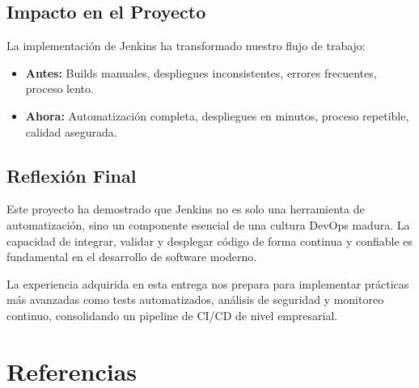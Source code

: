 \documentclass[12pt,a4paper]{article}
\begin{document}
\subsection{Impacto en el Proyecto}

La implementación de Jenkins ha transformado nuestro flujo de trabajo:

\begin{itemize}
    \item \textbf{Antes:} Builds manuales, despliegues inconsistentes, errores frecuentes, proceso lento.
    
    \item \textbf{Ahora:} Automatización completa, despliegues en minutos, proceso repetible, calidad asegurada.
\end{itemize}

\subsection{Reflexión Final}

Este proyecto ha demostrado que Jenkins no es solo una herramienta de automatización, sino un componente esencial de una cultura DevOps madura. La capacidad de integrar, validar y desplegar código de forma continua y confiable es fundamental en el desarrollo de software moderno.

La experiencia adquirida en esta entrega nos prepara para implementar prácticas más avanzadas como tests automatizados, análisis de seguridad y monitoreo continuo, consolidando un pipeline de CI/CD de nivel empresarial.

\newpage

\section{Referencias}
\end{document}

